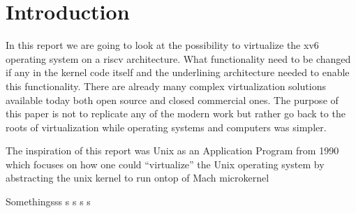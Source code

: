\section{Introduction}

In this report we are going to look at the possibility to virtualize the xv6 operating system on a riscv architecture. What functionality need to be changed if any in the kernel code itself and the underlining architecture needed to enable this functionality. There are already many complex virtualization solutions available today both open source and closed commercial ones. The purpose of this paper is not to replicate any of the modern work but rather go back to the roots of virtualization while operating systems and computers was simpler.

The inspiration of this report was Unix as an Application Program \cite{Golubunix} from 1990 which focuses on how one could “virtualize” the Unix operating system by abstracting the unix kernel to run ontop of Mach microkernel

Somethingsss s s s s